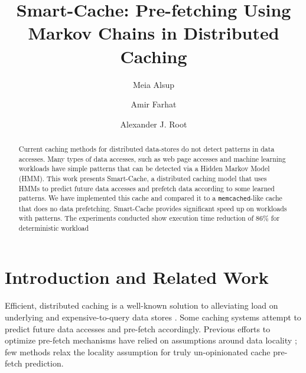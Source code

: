 \documentclass[sigconf]{acmart}
\begin{document}
\title{Smart-Cache: Pre-fetching Using Markov Chains in Distributed Caching}

\author{Meia Alsup}

\author{Amir Farhat}
\authornotemark[1]
\author{Alexander J. Root}
\authornotemark[1]

\renewcommand{\shortauthors}{Alsup*, Farhat*, Root*}

\begin{abstract}
Current caching methods for distributed data-stores do not detect patterns in data accesses. Many types of data accesses, such as web page accesses and machine learning workloads have simple patterns that can be detected via a Hidden Markov Model (HMM). This work presents Smart-Cache, a distributed caching model that uses HMMs to predict future data accesses and prefetch data according to some learned patterns. We have implemented this cache and compared it to a \texttt{memcached}-like cache that does no data prefetching. Smart-Cache provides significant speed up on workloads with patterns. The experiments conducted show execution time reduction of 86\% for deterministic workload

\end{abstract}


\maketitle

\section{Introduction and Related Work}
\label{sec:intro}

Efficient, distributed caching is a well-known solution to alleviating load on underlying and expensive-to-query data stores \cite{Memcached}. Some caching systems attempt to predict future data accesses and pre-fetch accordingly.  Previous efforts to optimize pre-fetch mechanisms have relied on assumptions around data locality \cite{SequentialPrefetch}; few methods relax the locality assumption for truly un-opinionated cache pre-fetch prediction. 
\end{document}
